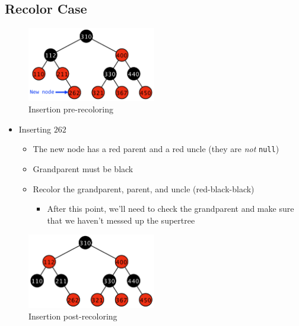 \documentclass[
  10pt,
  english,
  letterpaper,
,tablecaptionabove
]{scrartcl}
\newcommand{\passthrough}[1]{#1}
\providecommand{\tightlist}{%
  \setlength{\itemsep}{0pt}\setlength{\parskip}{0pt}}
\begin{document}
\hypertarget{recolor-case}{%
\subsection{Recolor Case}\label{recolor-case}}

\begin{figure}
\centering
\includegraphics[width=0.5\textwidth,height=\textheight]{images/2.png}
\caption{Insertion pre-recoloring}
\end{figure}

\begin{itemize}
\tightlist
\item
  Inserting \(262\)

  \begin{itemize}
  \tightlist
  \item
    The new node has a red parent and a red uncle (they are \emph{not}
    \passthrough{\lstinline!null!})
  \item
    Grandparent must be black
  \item
    Recolor the grandparent, parent, and uncle (red-black-black)

    \begin{itemize}
    \tightlist
    \item
      After this point, we'll need to check the grandparent and make
      sure that we haven't messed up the supertree
    \end{itemize}
  \end{itemize}
\end{itemize}

\begin{figure}
\centering
\includegraphics[width=0.5\textwidth,height=\textheight]{images/3.png}
\caption{Insertion post-recoloring}
\end{figure}
\end{document}
